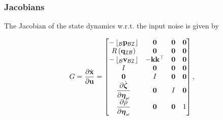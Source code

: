 \documentclass{beamer}
\begin{document}
\begin{frame}
\frametitle{Jacobians}
The Jacobian of the state dynamics w.r.t. the input noise is given
by

\begin{equation}
G=\dfrac{\partial\dot{{\bf x}}}{\partial{\bf u}}=\begin{bmatrix}-\left\lfloor _{\mathcal{B}}{\bf p}_{\mathcal{B}\mathcal{I}}\right\rfloor  & {\bf 0} & {\bf 0} & {\bf 0}\\
R\left({\bf q}_{\mathcal{I}\mathcal{B}}\right) & {\bf 0} & {\bf 0} & {\bf 0}\\
-\left\lfloor _{\mathcal{B}}{\bf v}_{\mathcal{B}\mathcal{I}}\right\rfloor  & -{\bf k}{\bf k}^{\top} & {\bf 0} & {\bf 0}\\
I & {\bf 0} & {\bf 0} & {\bf 0}\\
{\bf 0} & I & {\bf 0} & {\bf 0}\\
\dfrac{\partial\dot{\boldsymbol{\zeta}}}{\partial\boldsymbol{\eta}_{\omega}} & {\bf 0} & I & {\bf 0}\\
\dfrac{\partial\dot{\rho}}{\partial\boldsymbol{\eta}_{\omega}} & {\bf 0} & {\bf 0} & 1
\end{bmatrix},
\end{equation}
\end{frame}
\end{document}
